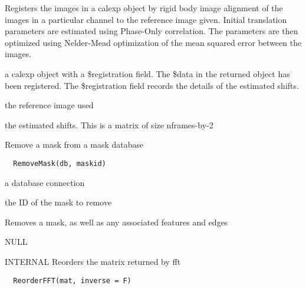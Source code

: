 \documentclass[a4paper]{book}
\begin{document}
%
\begin{Details}\relax
Registers the images in a calexp object by rigid body
image alignment of the images in a particular channel to
the reference image given.  Initial translation
parameters are estimated using Phase-Only correlation.
The parameters are then optimized using Nelder-Mead
optimization of the mean squared error between the
images.
\end{Details}
%
\begin{Value}
a calexp object with a \bsl{}\$registration field.  The \bsl{}\$data
in the returned object has been registered.  The
\bsl{}\$registration field records the details of the estimated
shifts.  \begin{ldescription}
\item[\code{refimg}] the reference image used
\item[\code{mpars}] the estimated shifts. This is a matrix of
size nframes-by-2
\end{ldescription}
\end{Value}
%
\begin{Description}\relax
Remove a mask from a mask database
\end{Description}
%
\begin{Usage}
\begin{verbatim}
  RemoveMask(db, maskid)
\end{verbatim}
\end{Usage}
%
\begin{Arguments}
\begin{ldescription}
\item[\code{db}] a database connection

\item[\code{maskid}] the ID of the mask to remove
\end{ldescription}
\end{Arguments}
%
\begin{Details}\relax
Removes a mask, as well as any associated features and
edges
\end{Details}
%
\begin{Value}
NULL
\end{Value}
%
\begin{Description}\relax
INTERNAL Reorders the matrix returned by fft
\end{Description}
%
\begin{Usage}
\begin{verbatim}
  ReorderFFT(mat, inverse = F)
\end{verbatim}
\end{Usage}
\end{document}
